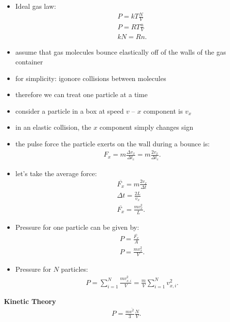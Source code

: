 \documentclass[10pt]{article}
\begin{document}
\begin{itemize}
    \item Ideal gas law:
    \begin{align}
        P = kT \frac{N}{V} \\
        P = RT \frac{n}{V} \\
        kN = Rn
    .\end{align} 
    \item assume that gas molecules bounce elastically off of the walls of the gas container
    \item for simplicity: igonore collisions between molecules
    \item therefore we can treat one particle at a time
    \item consider a particle in a box at speed $v$ -- $x$ component is $v_x$
    \item in an elastic collision, the $x$ component simply changes sign
    \item the pulse force the particle exerts on the wall during a bounce is:
    \begin{align}
        F_x = m \frac{\Delta v_x}{\Delta t_c} = m \frac{2v_x}{\Delta t_c}
    .\end{align}
\item let's take the average force:
    \begin{align}
        \overline{F_x} = m \frac{2v_x}{\Delta t} \\ 
        \Delta t = \frac{2L}{v_x} \\ 
        \overline{F_x} = \frac{mv_x^2}{L}
    .\end{align}
\item Pressure for one particle can be given by:
    \begin{align*}
        P = \frac{\overline{F_x}}{A} \\ 
        P = \frac{mv_x^2}{V}
    .\end{align*}
\item Pressure for $N$ particles:
    \begin{align*}
        P = \sum_{i=1}^{N} \frac{mv_{x,i}^2}{V} = \frac{m}{V} \sum_{i=1}^{N} v_{x,i}^2
    .\end{align*}
\end{itemize}
\begin{theorem}
    \textbf{Kinetic Theory}
    \begin{align*}
        P = \frac{m \overline{v^2}}{3} \frac{N}{V}
    .\end{align*}
\end{theorem}
\end{document}
